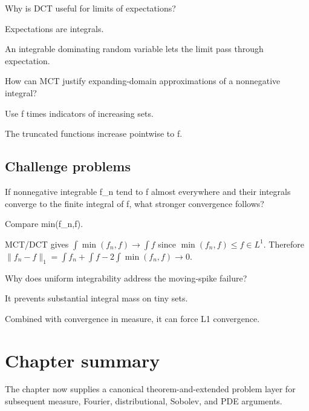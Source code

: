\begin{exercise}\label{exr:iii04-expand-13}
Why is DCT useful for limits of expectations?
\end{exercise}
\begin{hint}
Expectations are integrals.
\end{hint}
\begin{solution}
An integrable dominating random variable lets the limit pass through expectation.
\end{solution}

\begin{exercise}\label{exr:iii04-expand-14}
How can MCT justify expanding-domain approximations of a nonnegative integral?
\end{exercise}
\begin{hint}
Use f times indicators of increasing sets.
\end{hint}
\begin{solution}
The truncated functions increase pointwise to f.
\end{solution}

\subsection*{Challenge problems}

\begin{exercise}\label{exr:iii04-expand-15}
If nonnegative integrable f\_n tend to f almost everywhere and their integrals converge to the finite integral of f, what stronger convergence follows?
\end{exercise}
\begin{hint}
Compare min(f\_n,f).
\end{hint}
\begin{solution}
MCT/DCT gives $\int\min(f_n,f)\to\int f$ since $\min(f_n,f)\le f\in L^1$. Therefore $\|f_n-f\|_1=\int f_n+\int f-2\int\min(f_n,f)\to0$.
\end{solution}

\begin{exercise}\label{exr:iii04-expand-16}
Why does uniform integrability address the moving-spike failure?
\end{exercise}
\begin{hint}
It prevents substantial integral mass on tiny sets.
\end{hint}
\begin{solution}
Combined with convergence in measure, it can force L1 convergence.
\end{solution}
\section*{Chapter summary}
The chapter now supplies a canonical theorem-and-extended problem layer for subsequent measure, Fourier, distributional, Sobolev, and PDE arguments.
